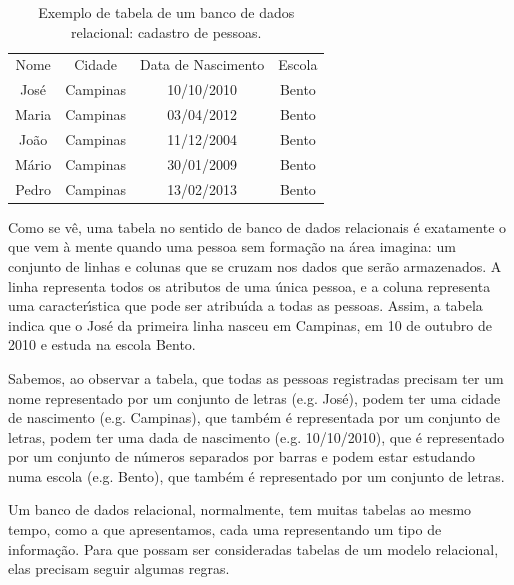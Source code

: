\documentclass[
12pt,		%
openright,	%
twoside,  %
a4paper,			%
chapter=TITLE,		%
english,			%
french,				%
spanish,			%
brazil				%
]{USPSC-classe/USPSC}
\begin{document}
\begin{table}[htb]
\tiny
\caption{\label{f66c1ac239a347d2b455611f794c18300b1974b6}Exemplo de tabela de um banco de dados relacional: cadastro de pessoas.}

\centering
\begin{tabular}{|c|c|c|c|}
\hline
Nome  &  Cidade  &  Data de Nascimento  &  Escola \\
Jos\'e  &  Campinas  &  10/10/2010  &  Bento \\
Maria  &  Campinas  &  03/04/2012  &  Bento \\
Jo\~ao  &  Campinas  &  11/12/2004  &  Bento \\
M\'ario  &  Campinas  &  30/01/2009  &  Bento \\
Pedro  &  Campinas  &  13/02/2013  &  Bento \\
\hline
\end{tabular}
\end{table}


Como se v\^e, uma tabela no sentido de banco de dados relacionais \'e exatamente o que vem \`a mente quando uma pessoa sem forma\c{c}\~ao na \'area imagina: um conjunto de linhas e colunas que se cruzam nos dados que ser\~ao armazenados. A linha representa todos os atributos de uma \'unica pessoa, e a coluna representa uma caracter\'{\i}stica que pode ser atribu\'{\i}da a todas as pessoas. Assim, a tabela indica que o  Jos\'e da primeira linha nasceu em Campinas, em 10 de outubro de 2010 e estuda na escola Bento.








Sabemos, ao observar a tabela, que todas as pessoas registradas precisam ter um nome representado por um conjunto de letras (e.g. Jos\'e), podem ter uma cidade de nascimento (e.g. Campinas), que tamb\'em \'e representada por um conjunto de letras, podem ter uma dada de nascimento (e.g. 10/10/2010), que \'e representado por um conjunto de n\'umeros separados por barras e podem estar estudando numa escola (e.g. Bento), que tamb\'em \'e representado por um conjunto de letras.








Um banco de dados relacional, normalmente, tem muitas tabelas ao mesmo tempo, como a que apresentamos, cada uma representando um tipo de informa\c{c}\~ao. Para que possam ser consideradas tabelas de um modelo relacional, elas precisam seguir algumas regras.
\end{document}
